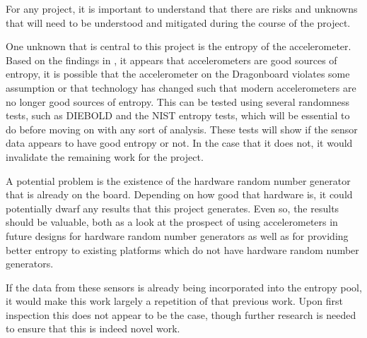 

For any project, it is important to understand that there are risks and unknowns
that will need to be understood and mitigated during the course of the project.

One unknown that is central to this project is the entropy of the accelerometer.
Based on the findings in \cite{voris}, it appears that accelerometers are good
sources of entropy, it is possible that the accelerometer on the Dragonboard
violates some assumption or that technology has changed such that modern
accelerometers are no longer good sources of entropy. This can be tested using
several randomness tests, such as DIEBOLD and the NIST entropy tests, which will
be essential to do before moving on with any sort of analysis.  These tests will
show if the sensor data appears to have good entropy or not.  In the case that
it does not, it would invalidate the remaining work for the project. 

A potential problem is the existence of the hardware random number generator
that is already on the board. Depending on how good that hardware is, it could
potentially dwarf any results that this project generates. Even so, the results
should be valuable, both as a look at the prospect of using accelerometers in
future designs for hardware random number generators as well as for providing
better entropy to existing platforms which do not have hardware random number
generators. 

If the data from these sensors is already being incorporated into the entropy
pool, it would make this work largely a repetition of that previous work. Upon
first inspection this does not appear to be the case, though further research is
needed to ensure that this is indeed novel work.
